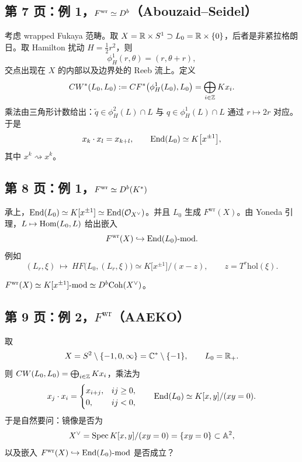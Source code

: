 \subsection*{第 7 页：例 1，$F^{\mathrm{wr}}\simeq D^{b}$（Abouzaid--Seidel）}

考虑 wrapped Fukaya 范畴。取 $X=\mathbb{R}\times S^1\supset L_0=\mathbb{R}\times\{0\}$，后者是非紧拉格朗日。取 Hamilton 扰动 $H=\tfrac12r^2$，则
\[
\phi^1_H(r,\theta)=(r,\theta+r),
\]
交点出现在 $X$ 的内部以及边界处的 Reeb 流上。定义
\[
CW^*(L_0,L_0):=CF^*\bigl(\phi^1_H(L_0),L_0\bigr)=\bigoplus_{i\in\mathbb{Z}}Kx_i .
\]
乘法由三角形计数给出：$\tilde q\in\phi^2_H(L)\cap L$ 与 $q\in\phi^1_H(L)\cap L$ 通过 $r\mapsto2r$ 对应。于是
\[
x_k\cdot x_l=x_{k+l},\qquad \operatorname{End}(L_0)\simeq K\bigl[x^{\pm1}\bigr],
\]
其中 $x^k\rightsquigarrow x^k$。

\subsection*{第 8 页：例 1，$F^{\mathrm{wr}}\simeq D^{b}(K^*)$}

承上，$\operatorname{End}(L_0)\simeq K[x^{\pm1}]\simeq\operatorname{End}(\mathcal{O}_{X^\vee})$。并且 $L_0$ 生成 $F^{\mathrm{wr}}(X)$。由 Yoneda 引理，$L\mapsto\operatorname{Hom}(L_0,L)$ 给出嵌入
\[
F^{\mathrm{wr}}(X)\hookrightarrow \operatorname{End}(L_0)\text{-}\mathrm{mod}.
\]
例如
\[
(L_r,\xi)\ \longmapsto\ HF\bigl(L_0,(L_r,\xi)\bigr)\simeq K\bigl[x^{\pm1}\bigr]/(x-z),
\qquad z=T^r\mathrm{hol}(\xi).
\]
\begin{theo}
$F^{\mathrm{wr}}(X)\simeq K[x^{\pm1}]\text{-}\mathrm{mod}\simeq D^{b}\mathrm{Coh}(X^\vee)$。
\end{theo}

\subsection*{第 9 页：例 2，$F^{\mathrm{wr}}$（AAEKO）}

取
\[
X=S^2\setminus\{-1,0,\infty\}=\mathbb{C}^*\setminus\{-1\},\qquad L_0=\mathbb{R}_+ .
\]
则 $CW(L_0,L_0)=\bigoplus_{i\in\mathbb{Z}}Kx_i$，乘法为
\[
x_j\cdot x_i=\begin{cases}x_{i+j}, & ij\ge0,\\ 0, & ij<0,\end{cases}
\qquad\operatorname{End}(L_0)\simeq K[x,y]/(xy=0).
\]
于是自然要问：镜像是否为
\[
X^\vee=\operatorname{Spec} K[x,y]/(xy=0)=\{xy=0\}\subset\mathbb{A}^2,
\]
以及嵌入 $F^{\mathrm{wr}}(X)\hookrightarrow\operatorname{End}(L_0)\text{-}\mathrm{mod}$ 是否成立？

